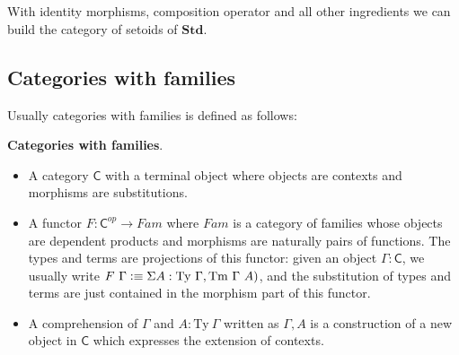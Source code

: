\begin{code}
\\
\>  \AgdaSymbol{(}  \AgdaSymbol{:} \AgdaSymbol{)} \AgdaSymbol{:}  \<%
\\
\>[0]\<[2]%
\>[2]\<%
\\
\>[2]\<[4]%
\>[4] \<[9]%
\>[9]\AgdaSymbol{:}       \<%
\\
\>[2]\<[4]%
\>[4] \AgdaSymbol{:} \AgdaSymbol{\{}  \AgdaSymbol{:}   \AgdaSymbol{\}}  \<[27]%
\>[27]\<%
\\
\>[4]\<[11]%
\>[11]\AgdaFunction{[}  \AgdaFunction{]}     \<[25]%
\>[25]\<%
\\
\>[4]\<[11]%
\>[11]\AgdaFunction{[}  \AgdaFunction{]}     \<%
\\
\end{code}


With identity morphisms, composition operator and all other ingredients we can build the category of setoids of $\textbf{Std}$.


\subsection{Categories with families}

Usually categories with families is defined as follows:

\begin{definition}\label{cwf:def}
\textbf{Categories with families}.

\begin{itemize}
\item A category $\mathsf{C}$ with a terminal object where objects are contexts and morphisms are substitutions.

\item A functor $F : \mathsf{C}^{op} \to Fam$ where $Fam$ is a category of families whose objects are dependent products and morphisms are naturally pairs of functions. The types and terms are projections of this functor: given an object $\Gamma : \mathsf{C}$, we usually write $F ~ \Gamma \vcentcolon\equiv \Sigma A : \text{Ty} ~\Gamma, \text{Tm} ~\Gamma ~ A)$, and the substitution of types and terms are just contained in the morphism part of this functor. 

\item A comprehension of $\Gamma$ and $A : \text{Ty}~ \Gamma$ written as $\Gamma, A$ is a construction of a new object in $\mathsf{C}$ which expresses the extension of contexts.
\end{itemize}

\end{definition}

